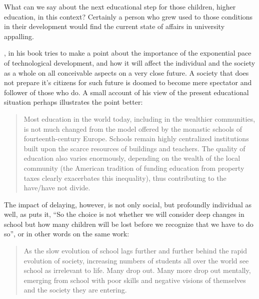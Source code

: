 What can we say about the next educational step for those children, higher
education, in this context?
Certainly a person who grew used to those conditions in their development 
would find the current state of affairs in university appalling. 

\cite{futurism:kurzweil_singularity_is_near}, in his book tries to make a point
about the importance of the exponential pace of technological development, and
how it will affect the individual and the society as a whole on all conceivable
aspects on a very close future.  A society that does not prepare it's citizens
for such future is doomed to become mere spectator and follower of those who do.
A small account of his view of the present educational situation perhaps
illustrates the point better:

\begin{quotation}
    Most education in the world today, including in the wealthier communities,
    is not much changed from the model offered by the monastic schools of
    fourteenth-century Europe. Schools remain highly centralized institutions
    built upon the scarce resources of buildings and teachers. The quality of
    education also varies enormously, depending on the wealth of the local
    community (the American tradition of funding education from property taxes
    clearly exacerbates this inequality), thus contributing to the have/have not
    divide.
\end{quotation}

The impact of delaying, however, is not only social, but profoundly individual as well, as
\cite{education:papert_gaston_vision_for_education} puts it, ``So the choice is
not whether we will consider deep changes in school but how many children will
be lost before we recognize that we have to do so'', or in other words on the
same work:
\begin{quotation}
    As the slow evolution of school lags further and further behind the rapid
    evolution of society, increasing numbers of students all over the world see
    school as irrelevant to life. Many drop out. Many more drop out mentally,
    emerging from school with poor skills and negative visions of themselves and the
    society they are entering.
\end{quotation}

